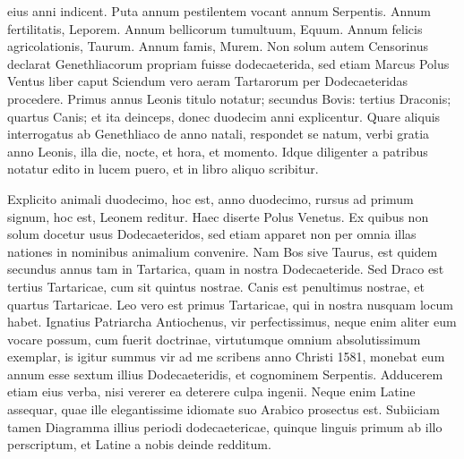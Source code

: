 eius anni indicent.
Puta annum pestilentem vocant annum Serpentis.
Annum
fertilitatis, Leporem.
Annum bellicorum tumultuum, Equum.
Annum
felicis agricolationis, Taurum.
Annum famis, Murem.
Non solum
autem Censorinus %
 declarat Genethliacorum propriam fuisse dodecaeterida,
sed etiam Marcus Polus Ventus liber  caput 
Sciendum vero
aeram Tartarorum per Dodecaeteridas procedere.
Primus annus Leonis
titulo notatur; secundus Bovis: tertius Draconis; quartus Canis; et
ita deinceps, donec duodecim anni explicentur.
Quare aliquis interrogatus
ab %
 Genethliaco de anno natali, respondet se natum, verbi gratia
anno Leonis, illa die, nocte, et hora, et momento.
Idque diligenter
a patribus notatur edito in lucem puero, et in libro aliquo scribitur.

Explicito animali duodecimo, hoc est, anno duodecimo, rursus ad
primum signum, hoc est, Leonem reditur.
Haec diserte Polus Venetus.
Ex quibus non solum docetur usus Dodecaeteridos, sed etiam apparet
non per omnia illas nationes in nominibus animalium convenire.
Nam Bos sive Taurus, est quidem secundus annus tam in Tartarica,
quam in nostra Dodecaeteride.
Sed Draco est tertius Tartaricae, cum
sit quintus nostrae.
Canis est penultimus nostrae, et quartus Tartaricae.
Leo vero est primus Tartaricae, qui in nostra nusquam locum habet.
Ignatius Patriarcha Antiochenus, vir perfectissimus, neque enim aliter
eum vocare possum, cum fuerit doctrinae, virtutumque omnium
absolutissimum exemplar, is igitur summus vir ad me scribens anno
Christi 1581, monebat eum annum esse sextum illius Dodecaeteridis,
et cognominem Serpentis.
Adducerem etiam eius verba, nisi vererer
ea deterere culpa ingenii.
Neque enim Latine assequar, quae ille elegantissime
idiomate suo Arabico prosectus est.
Subiiciam tamen
Diagramma illius periodi dodecaetericae, quinque linguis primum ab
illo perscriptum, et Latine a nobis deinde redditum. %

\begin{table}[htbp]
  
\end{table}

